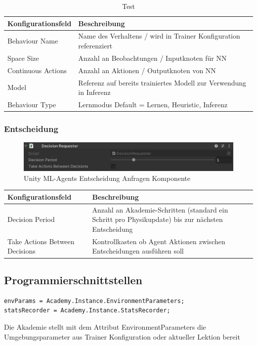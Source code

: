 \begin{table}[H]
\centering
{
\begin{tabular}{ |p{4cm}|p{8cm}| }
\hline
Konfigurationsfeld& Beschreibung \\
\hline
Behaviour Name & Name des Verhaltens / wird in Trainer Konfiguration referenziert \\
Space Size & Anzahl an Beobachtungen / Inputknoten für NN \\
Continuous Actions & Anzahl an Aktionen / Outputknoten von NN \\
Model & Referenz auf bereits trainiertes Modell zur Verwendung in Inferenz \\
Behaviour Type & Lernmodus Default = Lernen, Heuristic, Inferenz \\
\hline
\end{tabular}}
\caption{Test}
\end{table}

\subsubsection{Entscheidung}
\begin{figure}[H]
  \centering  
  \includegraphics[scale=0.5]{img/entscheidung_anfragen_komponente.png}
  \caption{Unity ML-Agents Entscheidung Anfragen Komponente}
  \label{fig:entscheidung_anfragen_komponente}
\end{figure}

\begin{center}
{
\begin{tabular}{ |p{4cm}|p{8cm}| }
\hline
Konfigurationsfeld& Beschreibung \\
\hline
Decision Period & Anzahl an Akademie-Schritten (standard ein Schritt pro Physikupdate) bis zur nächsten Entscheidung \\
Take Actions Between Decisions &  Kontrollkasten ob Agent Aktionen zwischen Entscheidungen ausführen soll \\
\hline
\end{tabular}}
\end{center}


\subsection{Programmierschnittstellen}
\begin{lstlisting}[caption={Academy Instanzvariablen},captionpos=b]
envParams = Academy.Instance.EnvironmentParameters;
statsRecorder = Academy.Instance.StatsRecorder;
\end{lstlisting}
Die Akademie stellt mit dem Attribut EnvironmentParameters die Umgebungsparameter aus Trainer Konfiguration oder aktueller Lektion bereit

